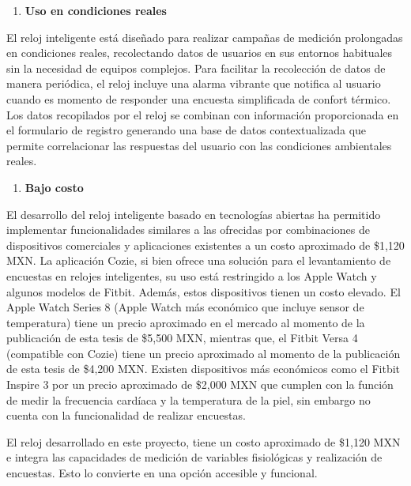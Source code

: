 \documentclass[
  12pt,
  letterpaper,
  DIV=11,
  numbers=noendperiod]{scrreport}
\providecommand{\tightlist}{%
  \setlength{\itemsep}{0pt}\setlength{\parskip}{0pt}}\usepackage{longtable,booktabs,array}
\begin{document}
\begin{enumerate}
\def\labelenumi{\arabic{enumi}.}
\setcounter{enumi}{1}
\tightlist
\item
  \textbf{Uso en condiciones reales}
\end{enumerate}

El reloj inteligente está diseñado para realizar campañas de medición
prolongadas en condiciones reales, recolectando datos de usuarios en sus
entornos habituales sin la necesidad de equipos complejos. Para
facilitar la recolección de datos de manera periódica, el reloj incluye
una alarma vibrante que notifica al usuario cuando es momento de
responder una encuesta simplificada de confort térmico. Los datos
recopilados por el reloj se combinan con información proporcionada en el
formulario de registro generando una base de datos contextualizada que
permite correlacionar las respuestas del usuario con las condiciones
ambientales reales.

\begin{enumerate}
\def\labelenumi{\arabic{enumi}.}
\setcounter{enumi}{2}
\tightlist
\item
  \textbf{Bajo costo}
\end{enumerate}

El desarrollo del reloj inteligente basado en tecnologías abiertas ha
permitido implementar funcionalidades similares a las ofrecidas por
combinaciones de dispositivos comerciales y aplicaciones existentes a un
costo aproximado de \$1,120 MXN. La aplicación Cozie, si bien ofrece una
solución para el levantamiento de encuestas en relojes inteligentes, su
uso está restringido a los Apple Watch y algunos modelos de Fitbit.
Además, estos dispositivos tienen un costo elevado. El Apple Watch
Series 8 (Apple Watch más económico que incluye sensor de temperatura)
tiene un precio aproximado en el mercado al momento de la publicación de
esta tesis de \$5,500 MXN, mientras que, el Fitbit Versa 4 (compatible
con Cozie) tiene un precio aproximado al momento de la publicación de
esta tesis de \$4,200 MXN. Existen dispositivos más económicos como el
Fitbit Inspire 3 por un precio aproximado de \$2,000 MXN que cumplen con
la función de medir la frecuencia cardíaca y la temperatura de la piel,
sin embargo no cuenta con la funcionalidad de realizar encuestas.

El reloj desarrollado en este proyecto, tiene un costo aproximado de
\$1,120 MXN e integra las capacidades de medición de variables
fisiológicas y realización de encuestas. Esto lo convierte en una opción
accesible y funcional.
\end{document}
